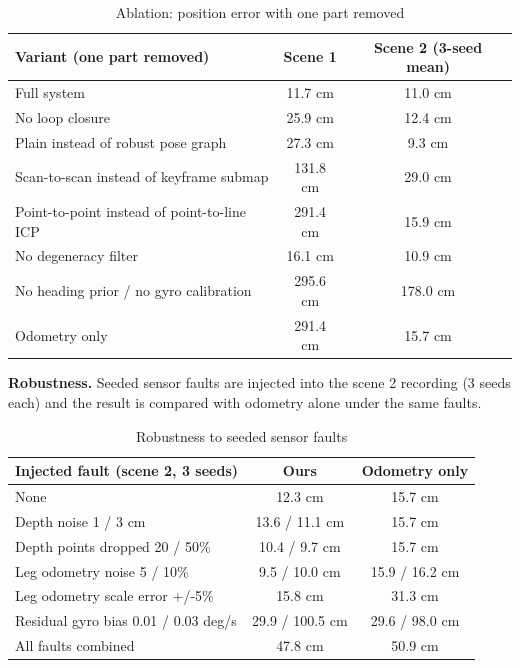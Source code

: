 \documentclass[11pt, a4paper]{article}
\begin{document}
\begin{table}[H]
    \centering
    \footnotesize
    \renewcommand{\arraystretch}{1.2}
    \begin{tabular}{|p{7.2cm}|c|c|}
        \hline
        \textbf{Variant (one part removed)} & \textbf{Scene 1} & \textbf{Scene 2 (3-seed mean)} \\
        \hline
        Full system & 11.7 cm & 11.0 cm \\
        \hline
        No loop closure & 25.9 cm & 12.4 cm \\
        \hline
        Plain instead of robust pose graph & 27.3 cm & 9.3 cm \\
        \hline
        Scan-to-scan instead of keyframe submap & 131.8 cm & 29.0 cm \\
        \hline
        Point-to-point instead of point-to-line ICP & 291.4 cm & 15.9 cm \\
        \hline
        No degeneracy filter & 16.1 cm & 10.9 cm \\
        \hline
        No heading prior / no gyro calibration & 295.6 cm & 178.0 cm \\
        \hline
        Odometry only & 291.4 cm & 15.7 cm \\
        \hline
    \end{tabular}
    \caption{Ablation: position error with one part removed}
\end{table}

\noindent
\textbf{Robustness.} Seeded sensor faults are injected into the scene 2 recording (3 seeds each) and the result is compared with odometry alone under the same faults.

\begin{table}[H]
    \centering
    \footnotesize
    \renewcommand{\arraystretch}{1.2}
    \begin{tabular}{|p{6.4cm}|c|c|}
        \hline
        \textbf{Injected fault (scene 2, 3 seeds)} & \textbf{Ours} & \textbf{Odometry only} \\
        \hline
        None & 12.3 cm & 15.7 cm \\
        \hline
        Depth noise 1 / 3 cm & 13.6 / 11.1 cm & 15.7 cm \\
        \hline
        Depth points dropped 20 / 50\% & 10.4 / 9.7 cm & 15.7 cm \\
        \hline
        Leg odometry noise 5 / 10\% & 9.5 / 10.0 cm & 15.9 / 16.2 cm \\
        \hline
        Leg odometry scale error +/-5\% & 15.8 cm & 31.3 cm \\
        \hline
        Residual gyro bias 0.01 / 0.03 deg/s & 29.9 / 100.5 cm & 29.6 / 98.0 cm \\
        \hline
        All faults combined & 47.8 cm & 50.9 cm \\
        \hline
    \end{tabular}
    \caption{Robustness to seeded sensor faults}
    \label{tab:faults}
\end{table}
\end{document}
